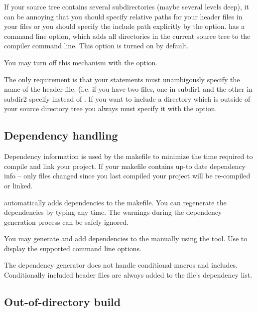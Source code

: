 If your source tree contains several subdirectories (maybe several levels
deep), it can be annoying that you should specify relative paths for your
header files in your  files or you should specify the include path
explicitly by the  option.  has a
command line option, which adds all directories in the current source tree
to the compiler command line. This option is turned on by default.

\begin{note}
You may turn off this mechanism with the  option.
\end{note}

The only requirement is that your  statements must unambigously
specify the name of the header file. (i.e. if you have two 
files, one in subdir1 and the other in subdir2 specify  instead of . If you want to
include a directory which is outside of your source directory tree you
always must specify it with the  option.


\subsection{Dependency handling}

Dependency information is used by the makefile to minimize the time required to
compile and link your project. If your makefile contains up-to date dependency info
-- only files changed since you last compiled your project will be re-compiled or linked.


 automatically adds dependencies to the makefile.
You can regenerate the dependencies by typing  any time.
The warnings during the dependency generation process can be safely ignored.


You may generate and add dependencies to the  manually using the 
tool. Use  to display the supported command line options.

\begin{note}
The dependency generator does not handle conditional macros and includes. Conditionally included header
files are always added to the file's dependency list.
\end{note}


\subsection{Out-of-directory build}

